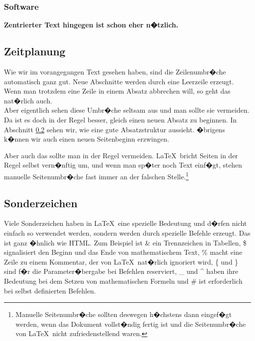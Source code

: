 \documentclass[11pt,a4paper]{article} %
\begin{document}
\subsubsection{Software}


\begin{center}
\begin{large}
\textbf{Zentrierter Text hingegen ist schon eher n�tzlich.}
\end{large}
\end{center}


\subsection{Zeitplanung}
\label{Umbrueche}

Wie wir im vorangegangen Text gesehen haben, sind die Zeilenumbr�che automatisch ganz gut. Neue Abschnitte werden durch eine Leerzeile erzeugt. Wenn man trotzdem eine Zeile in einem Absatz abbrechen will, so geht das nat�rlich auch. \\  Aber eigentlich sehen diese Umbr�che seltsam aus und man sollte sie vermeiden. Da ist es doch in der Regel besser, gleich einen neuen Absatz zu beginnen. In Abschnitt \ref{Sonderzeichen} sehen wir, wie eine gute Absatzstruktur aussieht. �brigens k�nnen wir auch einen neuen Seitenbeginn erzwingen.

\newpage

Aber auch das sollte man in der Regel vermeiden. \LaTeX\ bricht Seiten in der Regel selbst vern�nftig um, und wenn man sp�ter noch Text einf�gt, stehen manuelle Seitenumbr�che fast immer an der falschen Stelle.\footnote{Manuelle Seitenumbr�che sollten deswegen h�chstens dann eingef�gt werden, wenn das Dokument vollst�ndig fertig ist und die Seitenumbr�che von \LaTeX\ nicht zufriedenstellend waren.}

\subsection{Sonderzeichen}
\label{Sonderzeichen}

Viele Sonderzeichen haben in \LaTeX\ eine spezielle Bedeutung und d�rfen nicht einfach so verwendet werden, sondern werden durch spezielle Befehle erzeugt. Das ist ganz �hnlich wie HTML. Zum Beispiel ist \& ein Trennzeichen in Tabellen, \$ signalisiert den Beginn und das Ende von mathematischem Text, \% macht eine Zeile zu einem Kommentar, der von \LaTeX\ nat�rlich ignoriert wird, \{ und \} sind f�r die Parameter�bergabe bei Befehlen reserviert, \_ und \^{} haben ihre Bedeutung bei dem Setzen von mathematischen Formeln und \# ist erforderlich bei selbst definierten Befehlen.
\end{document}
